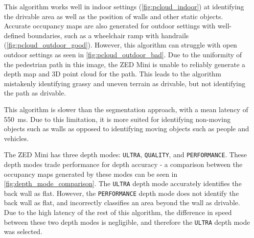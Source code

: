 This algorithm works well in indoor settings (\cref{fig:pcloud_indoor}) at identifying the drivable area
as well as the position of walls and other static objects. Accurate occupancy maps are also generated for
outdoor settings with well-defined boundaries, such as a wheelchair ramp with handrails (\cref{fig:pcloud_outdoor_good}).
However, this algorithm can struggle with open outdoor settings as seen in \cref{fig:pcloud_outdoor_bad}.
Due to the uniformity of the pedestrian path in this image, the ZED Mini is unable to
reliably generate a depth map and 3D point cloud for the path. This leads to the algorithm
mistakenly identifying grassy and uneven terrain as drivable, but not identifying the
path as drivable.

This algorithm is slower than the segmentation approach, with a mean latency of \SI{550}{\milli\second}.
Due to this limitation, it is more suited for identifying non-moving objects such as walls
as opposed to identifying moving objects such as people and vehicles.

The ZED Mini has three depth modes: \texttt{ULTRA}, \texttt{QUALITY}, and \texttt{PERFORMANCE}.
These depth modes trade performance for depth accuracy - a comparison between the occupancy maps
generated by these modes can be seen in \cref{fig:depth_mode_comparison}.
The \texttt{ULTRA} depth mode accurately identifies the back wall as flat.
However, the \texttt{PERFORMANCE} depth mode does not identify the back wall
as flat, and incorrectly classifies an area beyond the wall as drivable.
Due to the high latency of the rest of this algorithm, the difference in speed between these two depth modes is negligible,
and therefore the \texttt{ULTRA} depth mode was selected.


